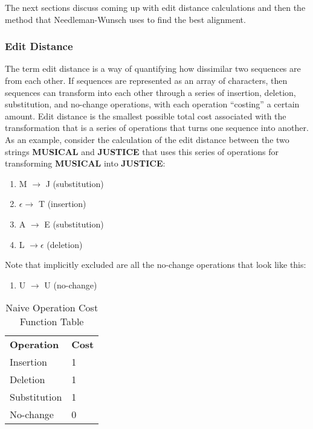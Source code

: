 The next sections discuss coming up with edit distance calculations and then the method that Needleman-Wunsch uses to find the best alignment. 

\subsubsection{Edit Distance}

The term edit distance is a way of quantifying how dissimilar two sequences are from each other. If sequences are represented as an array of characters, then sequences can transform into each other through a series of insertion, deletion, substitution, and no-change operations, with each operation ``costing'' a certain amount. Edit distance is the smallest possible total cost associated with the transformation that is a series of operations that turns one sequence into another. As an example, consider the calculation of the edit distance between the two strings \textbf{MUSICAL} and \textbf{JUSTICE} that uses this series of operations for transforming \textbf{MUSICAL} into \textbf{JUSTICE}:

\begin{enumerate}
\item M $\rightarrow$  J (substitution)
\item $\epsilon \rightarrow$  T (insertion)
\item A $\rightarrow$  E (substitution)
\item L $\rightarrow  \epsilon$ (deletion)
\end{enumerate}


Note that implicitly excluded are all the no-change operations that look like this:
\begin{enumerate}
\item U $\rightarrow$  U (no-change)
\end{enumerate}

\begin{table}[!h]
\centering
\begin{tabular}{ll}
\textbf{Operation} & \textbf{Cost} \\
Insertion          & 1             \\
Deletion           & 1             \\
Substitution       & 1             \\
No-change          & 0            
\end{tabular}
\caption{Naive Operation Cost Function Table}
\label{tab:naivetable}
\end{table}
	
